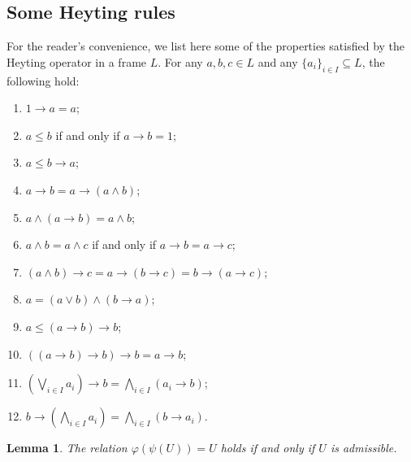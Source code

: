 \documentclass[10pt,a4paper]{amsart}
\newtheorem{lemma}{Lemma}
\newcommand{\tbigvee}{\mathop{\textstyle \bigvee }}%
\newcommand{\tbigwedge}{\mathop{\textstyle \bigwedge }}%
\begin{document}
\subsection{Some Heyting rules}
For the reader's convenience, we list here some of the properties satisfied by the Heyting operator in a frame $L$. For any $a,b,c\in L$ and any $\{a_i\}_{i\in I}\subseteq L$, the following hold:
\begin{enumerate}[label=\textup{(H\arabic*)},leftmargin=2.0\parindent]
\item \label{H1} $1\to a=a$\textup;
\item \label{H2} $a\leq b$ if and only if $a\to b=1$\textup;
\item \label{H3} $a\leq b\to a$\textup;
\item \label{H4} $a\to b=a\to (a\wedge b)$\textup;
\item \label{H5} $a\wedge (a\to b)=a\wedge b$\textup;
\item \label{H6} $a\wedge b=a\wedge c$ if and only if $a\to b=a\to c$\textup;
\item \label{H7} $(a\wedge b)\to c=a\to (b\to c)= b\to (a\to c)$\textup;
\item \label{H8} $a=(a\vee b)\wedge (b\to a)$\textup;
\item \label{H9} $a\leq (a\to b)\to b$\textup;
\item \label{H10} $((a\to b)\to b)\to b=a\to b$\textup;
\item \label{H11}$(\tbigvee_{i\in I}a_i)\to b= \tbigwedge_{i\in I}(a_i\to b)$\textup;
\item \label{H12}$b\to (\tbigwedge_{i\in I}a_i)= \tbigwedge_{i\in I}(b\to a_i)$\textup.
\end{enumerate}

\begin{lemma}\label{l: fixpoints phipsi}
The relation $\varphi(\psi(U))=U$ holds if and only if $U$ is admissible.
\end{lemma}
\end{document}

